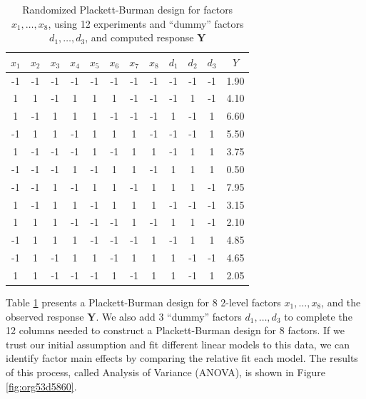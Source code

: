 \documentclass[conference]{IEEEtran}
\begin{document}
\begin{table}[ht]
\centering
\caption{Randomized Plackett-Burman design for factors $x_1, \dots, x_8$, using 12 experiments and ``dummy'' factors $d_1, \dots, d_3$, and computed response $\mathbf{Y}$}
\label{tab:plackett}
\begingroup\scriptsize
\begin{tabular}{cccccccccccc}
  \toprule
$x_1$ & $x_2$ & $x_3$ & $x_4$ & $x_5$ & $x_6$ & $x_7$ & $x_8$ & $d_1$ & $d_2$ & $d_3$ & $Y$ \\
  \midrule
-1 & -1 & -1 & -1 & -1 & -1 & -1 & -1 & -1 & -1 & -1 & 1.90 \\
  1 & 1 & -1 & 1 & 1 & 1 & -1 & -1 & -1 & 1 & -1 & 4.10 \\
  1 & -1 & 1 & 1 & 1 & -1 & -1 & -1 & 1 & -1 & 1 & 6.60 \\
  -1 & 1 & 1 & -1 & 1 & 1 & 1 & -1 & -1 & -1 & 1 & 5.50 \\
  1 & -1 & -1 & -1 & 1 & -1 & 1 & 1 & -1 & 1 & 1 & 3.75 \\
  -1 & -1 & -1 & 1 & -1 & 1 & 1 & -1 & 1 & 1 & 1 & 0.50 \\
  -1 & -1 & 1 & -1 & 1 & 1 & -1 & 1 & 1 & 1 & -1 & 7.95 \\
  1 & -1 & 1 & 1 & -1 & 1 & 1 & 1 & -1 & -1 & -1 & 3.15 \\
  1 & 1 & 1 & -1 & -1 & -1 & 1 & -1 & 1 & 1 & -1 & 2.10 \\
  -1 & 1 & 1 & 1 & -1 & -1 & -1 & 1 & -1 & 1 & 1 & 4.85 \\
  -1 & 1 & -1 & 1 & 1 & -1 & 1 & 1 & 1 & -1 & -1 & 4.65 \\
  1 & 1 & -1 & -1 & -1 & 1 & -1 & 1 & 1 & -1 & 1 & 2.05 \\
   \bottomrule
\end{tabular}
\endgroup
\end{table}

Table \ref{tab:plackett} presents a Plackett-Burman design for 8 2-level factors
\(x_1,\dots,x_8\), and the observed response \(\mathbf{Y}\). We also add 3 ``dummy''
factors \(d_1,\dots,d_3\) to complete the 12 columns needed to construct a
Plackett-Burman design for 8 factors. If we trust our initial assumption and fit
different linear models to this data, we can identify factor main effects by
comparing the relative fit each model. The results of this process, called
Analysis of Variance (ANOVA), is shown in Figure \ref{fig:org53d5860}.
\end{document}

